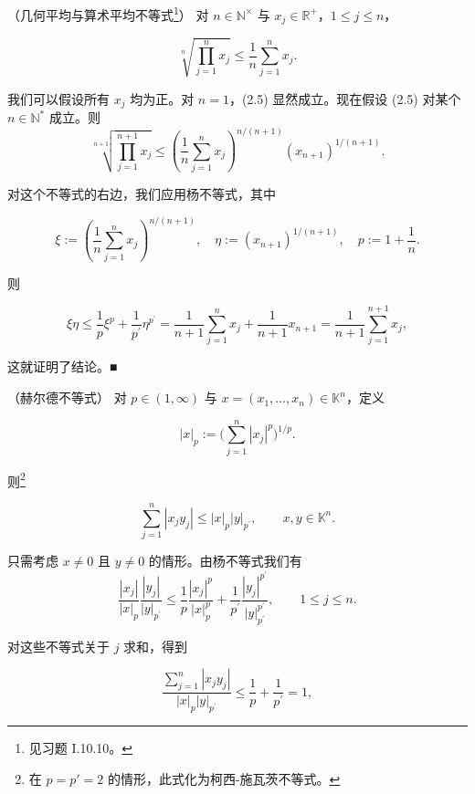 \begin{application}

\begin{items}
\item

（几何平均与算术平均不等式\footnote{见习题 I.10.10。}） 对 $ n \in \mathbb{N}^\times $ 与 $ x_j \in \mathbb{R}^+ $，$ 1 \leq j \leq n $，

\begin{equation}
\sqrt[n]{\prod_{j=1}^{n} x_{j}}\leq\frac{1}{n}\sum_{j=1}^{n} x_{j}.
\end{equation}

\proofhead
我们可以假设所有 $ x_j $ 均为正。对 $ n = 1 $，(2.5) 显然成立。现在假设 (2.5) 对某个 $ n \in \mathbb{N}^* $ 成立。则
\[
\sqrt[n+1]{\prod_{j=1}^{n+1}x_{j}}\leq\left(\frac{1}{n}\sum_{j=1}^{n}x_{j}\right)^{n/(n+1)}(x_{n+1})^{1/(n+1)}.
\]

对这个不等式的右边，我们应用杨不等式，其中

\[
\xi:=\left(\frac{1}{n}\sum_{j=1}^{n}x_{j}\right)^{n/(n+1)},\quad\eta:=(x_{n+1})^{1/(n+1)},\quad p:=1+\frac{1}{n}.
\]

则

\[
\xi\eta\leq\frac{1}{p}\xi^{p}+\frac{1}{p^{\prime}}\eta^{p^{\prime}}=\frac{1}{n+1}\sum_{j=1}^{n}x_{j}+\frac{1}{n+1}x_{n+1}=\frac{1}{n+1}\sum_{j=1}^{n+1}x_{j},
\]

这就证明了结论。■

\item

（赫尔德不等式） 对 $ p \in (1, \infty) $ 与 $ x = (x_1, \ldots, x_n) \in \mathbb{K}^n $，定义

\[
|x|_{p}:=\big(\sum_{j=1}^{n}|x_{j}|^{p}\big)^{1/p}.
\]

则\footnote{在 $ p = p' = 2 $ 的情形，此式化为柯西-施瓦茨不等式。}

\[
\sum_{j=1}^{n}\left|x_{j} y_{j}\right|\leq\left|x\right|_{p}\left|y\right|_{p^{\prime}},\qquad x,y\in\mathbb{K}^{n}.
\]

\proofhead
只需考虑 $ x \neq 0 $ 且 $ y \neq 0 $ 的情形。由杨不等式我们有
\[
\frac{|x_{j}|}{|x|_{p}}\frac{|y_{j}|}{|y|_{p^{\prime}}}\leq\frac{1}{p}\frac{|x_{j}|^{p}}{|x|_{p}^{p}}+\frac{1}{p^{\prime}}\frac{|y_{j}|^{p^{\prime}}}{|y|_{p^{\prime}}^{p^{\prime}}},\qquad1\leq j\leq n.
\]

对这些不等式关于 $j$ 求和，得到

\[
\frac{\sum_{j=1}^{n}\left|x_{j}y_{j}\right|}{\left|x\right|_{p}\left|y\right|_{p^{\prime}}}\leq\frac{1}{p}+\frac{1}{p^{\prime}}=1,
\]


\end{items}
\end{application}
